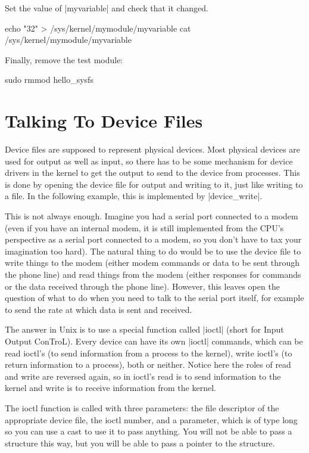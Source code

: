 \documentclass[10pt, oneside]{book}
\begin{document}
Set the value of \cpp|myvariable| and check that it changed.

\begin{codebash}
echo "32" > /sys/kernel/mymodule/myvariable
cat /sys/kernel/mymodule/myvariable
\end{codebash}

Finally, remove the test module:

\begin{codebash}
sudo rmmod hello_sysfs
\end{codebash}

\section{Talking To Device Files}
\label{sec:device_files}
Device files are supposed to represent physical devices.
Most physical devices are used for output as well as input, so there has to be some mechanism for device drivers in the kernel to get the output to send to the device from processes.
This is done by opening the device file for output and writing to it, just like writing to a file.
In the following example, this is implemented by \cpp|device_write|.

This is not always enough.
Imagine you had a serial port connected to a modem (even if you have an internal modem, it is still implemented from the CPU's perspective as a serial port connected to a modem, so you don't have to tax your imagination too hard).
The natural thing to do would be to use the device file to write things to the modem (either modem commands or data to be sent through the phone line) and read things from the modem (either responses for commands or the data received through the phone line).
However, this leaves open the question of what to do when you need to talk to the serial port itself, for example to send the rate at which data is sent and received.

The answer in Unix is to use a special function called \cpp|ioctl| (short for Input Output ConTroL).
Every device can have its own \cpp|ioctl| commands, which can be read ioctl's (to send information from a process to the kernel), write ioctl's (to return information to a process), both or neither.
Notice here the roles of read and write are reversed again, so in ioctl's read is to send information to the kernel and write is to receive information from the kernel.

The ioctl function is called with three parameters: the file descriptor of the appropriate device file, the ioctl number, and a parameter, which is of type long so you can use a cast to use it to pass anything.
You will not be able to pass a structure this way, but you will be able to pass a pointer to the structure.
\end{document}
